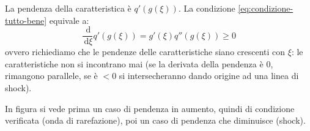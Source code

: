 \documentclass[10pt,a4paper,twoside,openright]{book}
\newcommand{\de}{\,\mathrm d}
\newcommand{\dxi}{\de \xi}
\begin{document}
\begin{nb}
	La pendenza della caratteristica è $\displaystyle q'(g(\xi)) .$ La condizione \eqref{eq:condizione-tutto-bene} equivale a:
	\begin{equation*}
		\frac{\de}{\dxi } q'(g(\xi)) =g'(\xi) q''(g(\xi)) \geqslant 0
	\end{equation*}
	ovvero richiediamo che le pendenze delle caratteristiche siano crescenti con $\xi $: le caratteristiche non si incontrano mai (se la derivata della pendenza è $0$, rimangono parallele, se è $< 0$ si intersecheranno dando origine ad una linea di shock).

	In figura si vede prima un caso di pendenza in aumento, quindi di condizione verificata (onda di rarefazione), poi un caso di pendenza che diminuisce (shock).

	\begin{figure}[H]
		\centering

	\begin{tikzpicture}[x=0.75pt,y=0.75pt,yscale=-1,xscale=1]


\end{tikzpicture}
\end{figure}
\end{nb}
\end{document}
